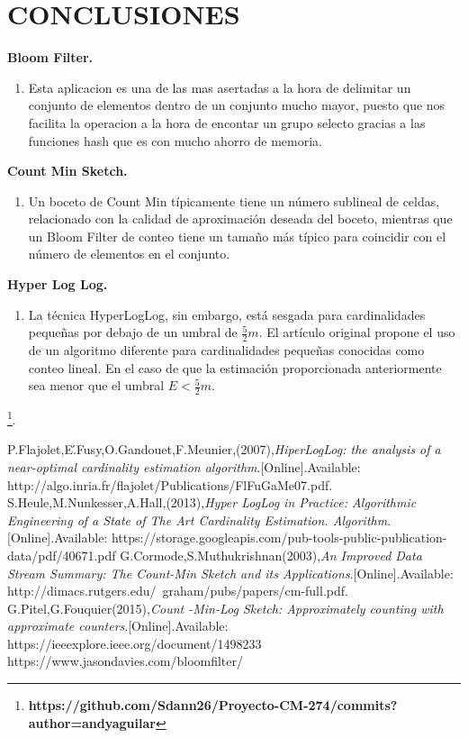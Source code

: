 \documentclass[journal]{IEEEtran}
\begin{document}
\section{CONCLUSIONES}
\textbf{Bloom Filter. }
\begin{enumerate}
\item Esta aplicacion es una de las mas asertadas a la hora de delimitar un conjunto de elementos dentro de un conjunto mucho mayor, puesto que nos facilita la operacion a la hora de encontar un grupo selecto gracias a las funciones hash que es con mucho ahorro de memoria.
\end{enumerate}
\textbf{Count Min Sketch. }
\begin{enumerate}
\item Un boceto de Count Min típicamente tiene un número sublineal de celdas, relacionado con la calidad de aproximación deseada del boceto, mientras que un  Bloom Filter de conteo tiene un tamaño más típico para coincidir con el número de elementos en el conjunto.

\end{enumerate}
\textbf{Hyper Log Log. }
\begin{enumerate}
\item La técnica HyperLogLog, sin embargo, está sesgada para cardinalidades pequeñas por debajo de un umbral de ${\textstyle {\frac {5}{2}} m}$. El artículo original propone el uso de un algoritmo diferente para cardinalidades pequeñas conocidas como conteo lineal. En el caso de que la estimación proporcionada anteriormente sea menor que el umbral ${\textstyle E <{\frac{5}{2}} m}$.

\end{enumerate}
\footnote{\textbf{https://github.com/Sdann26/Proyecto-CM-274/commits?author=andyaguilar}}.

\begin{thebibliography}{3}

 P.Flajolet,E\'.Fusy,O.Gandouet,F.Meunier,(2007),\textit{HiperLogLog: the analysis of a near-optimal cardinality estimation algorithm}.[Online].Available:
http://algo.inria.fr/flajolet/Publications/FlFuGaMe07.pdf.
 S.Heule,M.Nunkesser,A.Hall,(2013),\textit{Hyper LogLog in Practice: Algorithmic Engineering of a State of The Art Cardinality Estimation. Algorithm}.[Online].Available:
https://storage.googleapis.com/pub-tools-public-publication-data/pdf/40671.pdf
 G.Cormode,S.Muthukrishnan(2003),\textit{An Improved Data Stream Summary: The Count-Min Sketch and its Applications}.[Online].Available:
http://dimacs.rutgers.edu/~graham/pubs/papers/cm-full.pdf.
 G.Pitel,G.Fouquier(2015),\textit{Count -Min-Log Sketch: Approximately counting with approximate counters}.[Online].Available:
https://ieeexplore.ieee.org/document/1498233
 https://www.jasondavies.com/bloomfilter/
\end{thebibliography}
\end{document}

